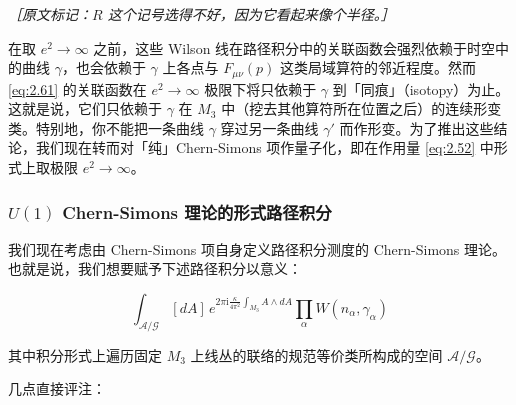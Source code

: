 {\small\itshape ［原文标记：$R$ 这个记号选得不好，因为它看起来像个半径。］}%

在取 $e^{2}\to\infty$ 之前，这些 Wilson 线在路径积分中的关联函数会强烈依赖于时空中的曲线 $\gamma$，也会依赖于 $\gamma$ 上各点与 $F_{\mu\nu}(p)$ 这类局域算符的邻近程度。然而 \eqref{eq:2.61} 的关联函数在 $e^{2}\to\infty$ 极限下将只依赖于 $\gamma$ 到「同痕」（isotopy）为止。这就是说，它们只依赖于 $\gamma$ 在 $M_3$ 中（挖去其他算符所在位置之后）的连续形变类。特别地，你不能把一条曲线 $\gamma$ 穿过另一条曲线 $\gamma'$ 而作形变。为了推出这些结论，我们现在转而对「纯」Chern-Simons 项作量子化，即在作用量 \eqref{eq:2.52} 中形式上取极限 $e^{2}\to\infty$。

\subsubsection{$U(1)$ Chern-Simons 理论的形式路径积分} %

我们现在考虑由 Chern-Simons 项自身定义路径积分测度的 Chern-Simons 理论。也就是说，我们想要赋予下述路径积分以意义：

\begin{equation}
  \int_{\mathcal{A}/\mathcal{G}}[dA]\,e^{2\pi\mathrm{i}\frac{\kappa}{4\pi^{2}}\int_{M_3}A\wedge dA}\prod_{\alpha}W(n_{\alpha},\gamma_{\alpha})
  \tag{2.62}
  \label{eq:2.62}
\end{equation}

其中积分形式上遍历固定 $M_3$ 上线丛的联络的规范等价类所构成的空间 $\mathcal{A}/\mathcal{G}$。

几点直接评注：



